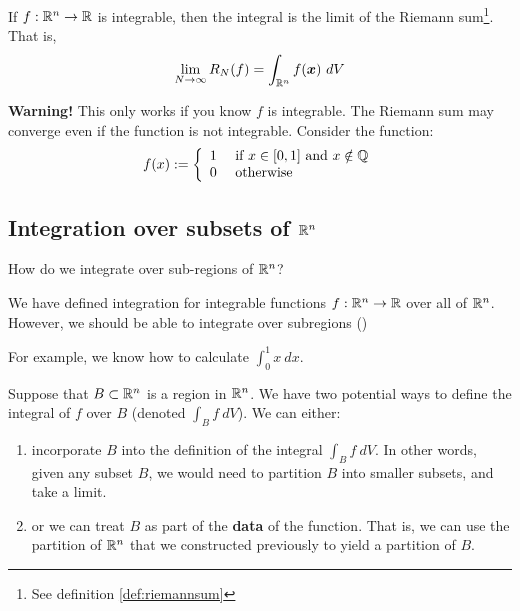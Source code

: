 \begin{proposition}\label{prop:riemannisintegrable}
    If $f: \mathbb{R}^n \to \mathbb{R}$ is integrable, then the integral is the limit of the Riemann sum\footnote{See definition \ref{def:riemannsum}}.  That is,
    $$\lim_{N \to \infty} R_N(f) = \int_{\mathbb{R}^n} f(\bm{x}) \ dV$$
    \end{proposition}
    
    \begin{example}
     \textbf{Warning!} This only works if you know $f$ is integrable.  The Riemann sum may converge even if the function is not integrable.  Consider the function: $$f(x) := \left\{
		\begin{array}{ll}
			1 & \text{ if } x \in [0,1] \text{ and }  x \notin \mathbb{Q} \\
			0 & \text{ otherwise}
		\end{array}
		\right.$$   
    \end{example}


\subsection{Integration over subsets of $\mathbb{R}^n$}

    \begin{motivating}
        How do we integrate over sub-regions of $\mathbb{R}^n$?
    \end{motivating}

    We have defined integration for integrable functions $f : \mathbb{R}^n \to \mathbb{R}$ over all of $\mathbb{R}^n$. However, we should be able to integrate over subregions ()

    For example, we know how to calculate $\int_0^1 x \ dx$.


    

    Suppose that $B \subset \mathbb{R}^n$ is a region in $\mathbb{R}^n$.  We have two potential ways to define the integral of $f$ over $B$ (denoted $\int_B f \ dV$).  We can either:

    \begin{enumerate}
        \item incorporate $B$ into the definition of the integral $\int_B f \ dV$.        
    In other words, given any subset $B$, we would need to partition $B$ into smaller subsets, and take a limit.
        \item or we can treat $B$ as part of the \textbf{data} of the function.
        That is, we can use the partition of $\mathbb{R}^n$ that we constructed previously to yield a partition of $B$.
        
    \end{enumerate}


